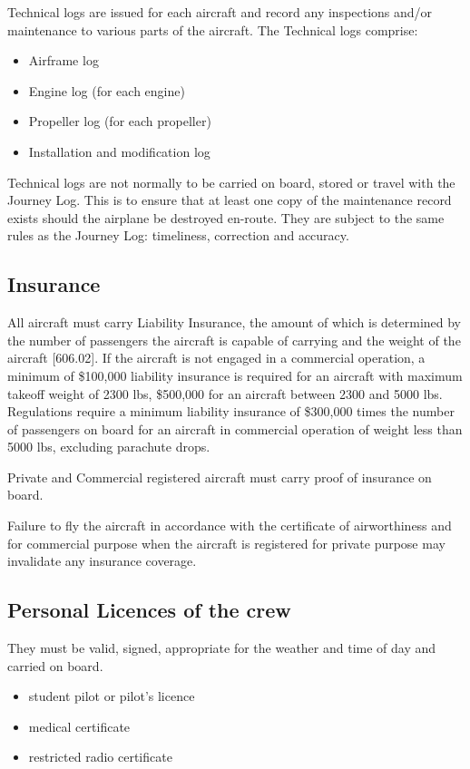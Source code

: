 \documentclass[12pt,letterpaper]{article}
\begin{document}
    Technical logs are issued for each aircraft and record any inspections and/or maintenance to various parts of the aircraft. The Technical logs comprise:
    \begin{itemize}
        \item Airframe log
        \item Engine log (for each engine)
        \item Propeller log (for each propeller)
        \item Installation and modification log
    \end{itemize}
    
    Technical logs are not normally to be carried on board, stored or travel with the Journey Log.  This is to ensure that at least one copy of the maintenance record exists should the airplane be destroyed en-route. They are subject to the same rules as the Journey Log: timeliness, correction and accuracy.
    
    \subsection{Insurance}
    
    All aircraft must carry Liability Insurance, the amount of which is determined by the number of passengers the aircraft is capable of carrying and the weight of the aircraft [606.02]. If the aircraft is not engaged in a commercial operation, a minimum of \$100,000 liability insurance is required for an aircraft with maximum takeoff weight of 2300 lbs, \$500,000 for an aircraft between 2300 and 5000 lbs. Regulations require a minimum liability insurance of \$300,000 times the number of passengers on board for an aircraft in commercial operation of weight less than 5000 lbs, excluding parachute drops.
    
    Private and Commercial registered aircraft must carry proof of insurance on board.
    
    Failure to fly the aircraft in accordance with the certificate of airworthiness and for commercial purpose when the aircraft is registered for private purpose may invalidate any insurance coverage.
    
    \subsection{Personal Licences of the crew}
    
    They must be valid, signed, appropriate for the weather and time of day and carried on board.
    \begin{itemize}
        \item student pilot or pilot’s licence
        \item medical certificate
        \item restricted radio certificate
    \end{itemize}
\end{document}
